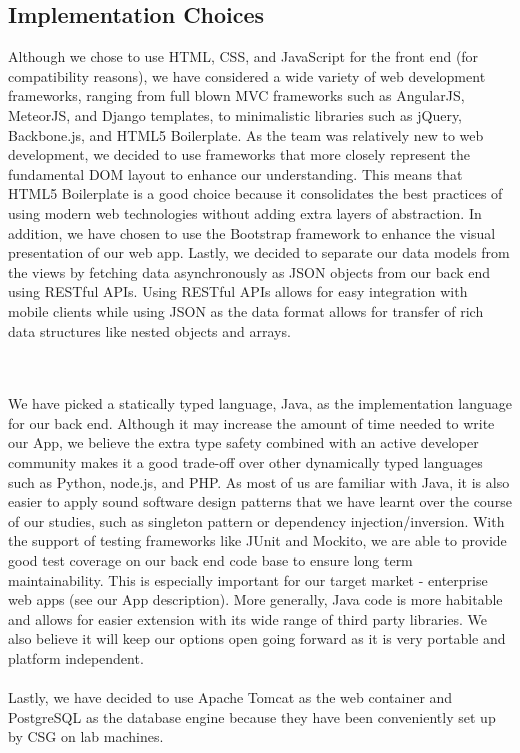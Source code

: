 \documentclass[10pt,a4paper]{article}
\begin{document}
\subsection{Implementation Choices}

Although we chose to use HTML, CSS, and JavaScript for the front end (for 
compatibility reasons), we have considered a wide variety of web development 
frameworks, ranging from full blown MVC frameworks such as AngularJS, MeteorJS, 
and Django templates, to minimalistic libraries such as jQuery, Backbone.js, and 
HTML5 Boilerplate. As the team was relatively new to web development, we decided 
to use frameworks that more closely represent the fundamental DOM layout to 
enhance our understanding. This means that HTML5 Boilerplate is a good choice 
because it consolidates the best practices of using modern web technologies 
without adding extra layers of abstraction. In addition, we have chosen to use 
the Bootstrap framework to enhance the visual presentation of our web app. 
Lastly, we decided to separate our data models from the views by fetching data 
asynchronously as JSON objects from our back end using RESTful APIs. Using 
RESTful APIs allows for easy integration with mobile clients while using JSON as 
the data format allows for transfer of rich data structures like nested objects 
and arrays.

\\
\\
\noindent
We have picked a statically typed language, Java, as the implementation language 
for our back end. Although it may increase the amount of time needed to write our 
App, we believe the extra type safety combined with an active developer 
community makes it a good trade-off over other dynamically typed languages such 
as Python, node.js, and PHP. As most of us are familiar with Java, it is also 
easier to apply sound software design patterns that we have learnt over the 
course of our studies, such as singleton pattern or dependency 
injection/inversion. With the support of testing frameworks like JUnit and 
Mockito, we are able to provide good test coverage on our back end code base to 
ensure long term maintainability. This is especially important for our target 
market - enterprise web apps (see our App description). More generally, Java 
code is more habitable and allows for easier extension with its wide range of 
third party libraries. We also believe it will keep our options open going 
forward as it is very portable and platform independent.
\\
\\
\noindent
Lastly, we have decided to use Apache Tomcat as the web container and PostgreSQL 
as the database engine because they have been conveniently set up by CSG on lab 
machines.
\end{document}
